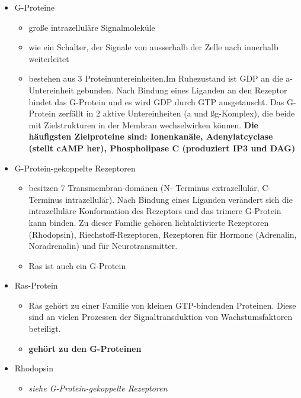 \documentclass{article}
\begin{document}
\begin{itemize}
    \item G-Proteine
        \begin{itemize}
            \item große intrazelluläre Signalmoleküle
            \item wie ein Schalter, der Signale von ausserhalb der Zelle nach innerhalb weiterleitet
            \item bestehen aus 3 Proteinuntereinheiten.Im Ruhezustand ist GDP an die a- Untereinheit gebunden. Nach Bindung eines Liganden an den Rezeptor bindet das G-Protein und es wird GDP durch GTP ausgetauscht. Das G-Protein zerfällt in 2 aktive Untereinheiten (a und ßg-Komplex), die beide mit Zielstrukturen in der Membran wechselwirken können. \textbf{Die häufigsten Zielproteine sind: Ionenkanäle, Adenylatcyclase (stellt cAMP her), Phospholipase C (produziert IP3 und DAG)} 
        \end{itemize}
        
    \item G-Protein-gekoppelte Rezeptoren
        \begin{itemize}
            \item besitzen 7 Transmembran-domänen (N- Terminus extrazellulär, C-Terminus intrazellulär). Nach Bindung eines Liganden verändert sich die intrazelluläre Konformation des Rezeptors und das trimere G-Protein kann binden. Zu dieser Familie gehören lichtaktivierte Rezeptoren (Rhodopsin), Riechstoff-Rezeptoren, Rezeptoren für Hormone (Adrenalin, Noradrenalin) und für Neurotransmitter.
            \item Ras ist auch ein G-Protein
        \end{itemize}

    \item Ras-Protein
        \begin{itemize}
            \item Ras gehört zu einer Familie von kleinen GTP-bindenden Proteinen. Diese sind an vielen Prozessen der Signaltransduktion von Wachstumsfaktoren beteiligt.
            \item \textbf{gehört zu den G-Proteinen}
        \end{itemize}

    \item Rhodopsin
        \begin{itemize}
            \item \textit{siehe G-Protein-gekoppelte Rezeptoren}
        \end{itemize}
 

\end{itemize}
\end{document}
